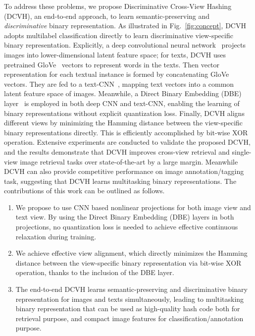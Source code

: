 \documentclass[10pt,twocolumn,letterpaper]{article}
\begin{document}
To address these problems, we propose Discriminative Cross-View Hashing (DCVH), an end-to-end approach, to learn semantic-preserving and {\it discriminative} binary representation. As illustrated in Fig.~\ref{fig:concept}, DCVH adopts multilabel classification directly to learn discriminative view-specific binary representation. Explicitly, a deep convolutional neural network~\cite{He_2016_CVPR} projects images into lower-dimensional latent feature space; for texts, DCVH uses pretrained GloVe~\cite{pennington2014glove} vectors to represent words in the texts. Then vector representation for each textual instance is formed by concatenating GloVe vectors. They are fed to a text-CNN~\cite{text_cnn}, mapping text vectors into a common latent feature space of images. Meanwhile, a Direct Binary Embedding (DBE) layer~\cite{dbe} is employed in both deep CNN and text-CNN, enabling the learning of binary representations without explicit quantization loss. Finally, DCVH aligns different views by minimizing the Hamming distance between the view-specific binary representations directly. This is efficiently accomplished by bit-wise XOR operation. Extensive experiments are conducted to validate the proposed DCVH, and the results demonstrate that DCVH improves cross-view retrieval and single-view image retrieval tasks over state-of-the-art by a large margin. Meanwhile DCVH can also provide competitive performance on image annotation/tagging task, suggesting that DCVH learns multitasking binary representations. The contributions of this work can be outlined as follows.
\begin{enumerate}
\itemsep0em 
\item We propose to use CNN based nonlinear projections for both image view and text view. By using the Direct Binary Embedding (DBE) layers in both projections, no quantization loss is needed to achieve effective continuous relaxation during training.
\item We achieve effective view alignment, which directly minimizes the Hamming distance between the view-specific binary representation via bit-wise XOR operation, thanks to the inclusion of the DBE layer.
\item The end-to-end DCVH learns semantic-preserving and discriminative binary representation for images and texts simultaneously, leading to multitasking binary representation that can be used as high-quality hash code both for retrieval purpose, and compact image features for classification/annotation purpose.
\end{enumerate}
\end{document}
